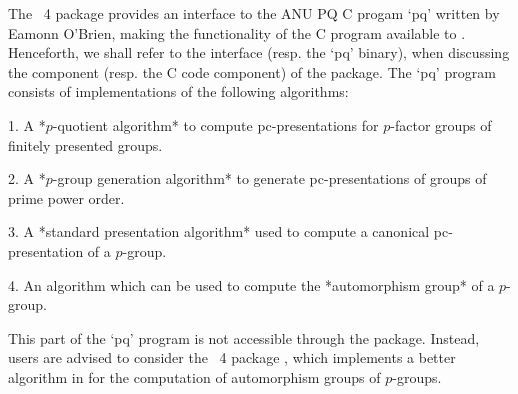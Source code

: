 

The {\GAP}~4 package {\ANUPQ} provides an  interface  to  the  ANU  PQ  C
progam `pq' written by Eamonn O'Brien, making the functionality of the  C
program available to {\GAP}. Henceforth, we shall refer to  the  {\ANUPQ}
interface (resp. the `pq' binary), when discussing the  {\GAP}  component
(resp. the C code component) of the {\ANUPQ} package.  The  `pq'  program
consists of implementations of the following algorithms:

\beginlist%

\item{1.}
A *$p$-quotient algorithm* to  compute  pc-presentations  for  $p$-factor
groups of finitely presented groups.


\item{2.} 
A *$p$-group generation algorithm* to generate pc-presentations of groups
of prime power order.


\item{3.}
A  *standard  presentation  algorithm*  used  to  compute   a   canonical
pc-presentation of a $p$-group.


\item{4.} 
An algorithm which can be used to compute the *automorphism group*  of  a
$p$-group.

\item{}
This part of the `pq' program is  not  accessible  through  the  {\ANUPQ}
package. Instead, users are advised  to  consider  the  {\GAP}~4  package
{\AutPGrp}, which  implements  a  better  algorithm  in  {\GAP}  for  the
computation of automorphism groups of $p$-groups.

